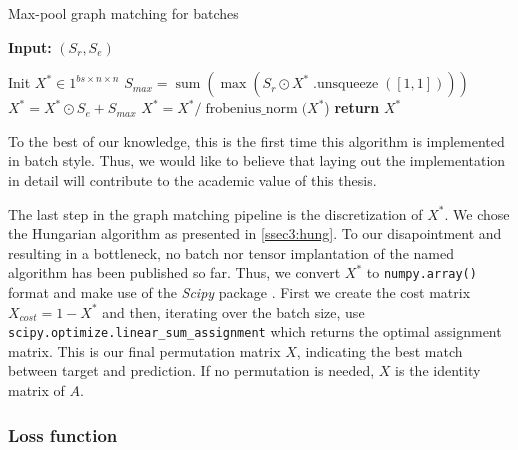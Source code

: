 \begin{algorithm}
    \caption{Max-pool graph matching for batches}
    \hspace*{\algorithmicindent} \textbf{Input:} $(S_r, S_e)$
    \begin{algorithmic}[1]
        \State Init $X^* \in 1^{bs\times n \times n}$
            \State $S_{max} = \operatorname{sum}(\operatorname{max}(S_r \odot X^*\operatorname{.unsqueeze}([1,1])))$ 
            \State $X^* = X^* \odot S_e + S_{max}$
            \State $X^* = X^* / \operatorname{frobenius\_norm}(X^*$)
        \EndFor
        \State \textbf{return} $X^*$
    \end{algorithmic}
    \label{alg4:maxpool}
\end{algorithm}


To the best of our knowledge, this is the first time this algorithm is implemented in batch style. Thus, we would like to believe that laying out the implementation in detail will contribute to the academic value of this thesis.  

The last step in the graph matching pipeline is the discretization of $X^*$. We chose the Hungarian algorithm as presented in \ref{ssec3:hung}. To our disapointment and resulting in a bottleneck, no batch nor tensor implantation of the named algorithm has been published so far. Thus, we convert $X^*$ to \texttt{numpy.array()} format and make use of the \textit{Scipy} package \cite{2020SciPy-NMeth}. First we create the cost matrix $X_{cost} = 1 - X^*$ and then, iterating over the batch size, use \texttt{scipy.optimize.linear\_sum\_assignment} which returns the optimal assignment matrix. This is our final permutation matrix $X$, indicating the best match between target and prediction. If no permutation is needed, $X$ is the identity matrix of $A$.




\subsubsection{Loss function}
\label{ssec4:loss}

